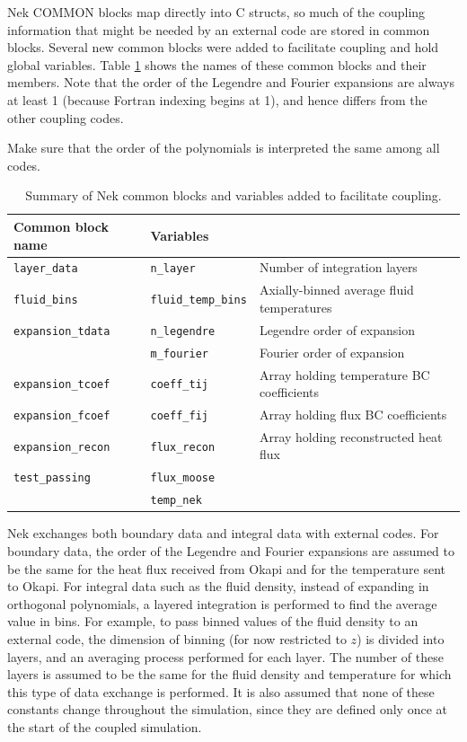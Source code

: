 \documentclass[10pt]{article}
\numberwithin{equation}{section} %
\begin{document}
Nek COMMON blocks map directly into C structs, so much of the coupling information that might be needed by an external code are stored in common blocks. Several new common blocks were added to facilitate coupling and hold global variables. Table \ref{table:NekCommon} shows the names of these common blocks and their members. Note that the order of the Legendre and Fourier expansions are always at least 1 (because Fortran indexing begins at 1), and hence differs from the other coupling codes.

\color{magenta}
Make sure that the order of the polynomials is interpreted the same among all codes.
\color{black}

\begin{table}[H]
\caption{Summary of Nek common blocks and variables added to facilitate coupling.}
\centering
\begin{tabular}{l l l}
\hline\hline
Common block name & Variables & \\ [0.5ex]
\hline
{\tt layer\_data} & {\tt n\_layer} & Number of integration layers\\
{\tt fluid\_bins} & {\tt fluid\_temp\_bins} & Axially-binned average fluid temperatures\\
{\tt expansion\_tdata} & {\tt n\_legendre} & Legendre order of expansion\\
& {\tt m\_fourier} & Fourier order of expansion\\
{\tt expansion\_tcoef} & {\tt coeff\_tij} & Array holding temperature BC coefficients\\
{\tt expansion\_fcoef} & {\tt coeff\_fij} & Array holding flux BC coefficients\\
{\tt expansion\_recon} & {\tt flux\_recon} & Array holding reconstructed heat flux\\
{\tt test\_passing} & {\tt flux\_moose} & \\
& {\tt temp\_nek} & \\
\hline
\end{tabular}
\label{table:NekCommon}
\end{table}

Nek exchanges both boundary data and integral data with external codes. For boundary data, the order of the Legendre and Fourier expansions are assumed to be the same for the heat flux received from Okapi and for the temperature sent to Okapi. For integral data such as the fluid density, instead of expanding in orthogonal polynomials, a layered integration is performed to find the average value in bins. For example, to pass binned values of the fluid density to an external code, the dimension of binning (for now restricted to \(z\)) is divided into layers, and an averaging process performed for each layer. The number of these layers is assumed to be the same for the fluid density and temperature for which this type of data exchange is performed. It is also assumed that none of these constants change throughout the simulation, since they are defined only once at the start of the coupled simulation.
\end{document}
